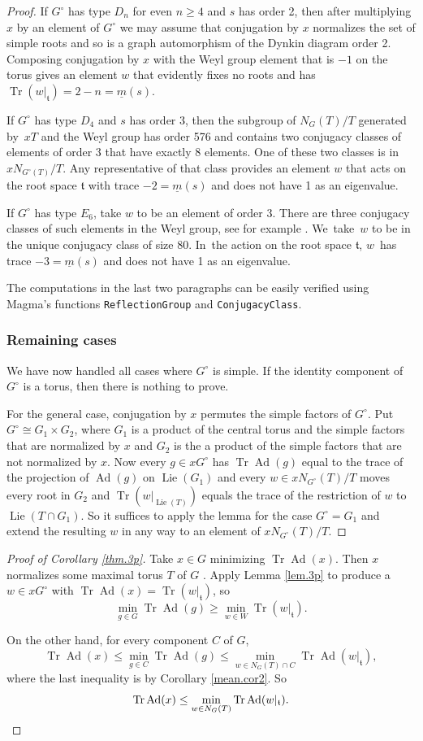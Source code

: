 \documentclass[JEP,XML,SOM,Unicode,NoFloatCountersInSection,published]{cedram}
\newcommand{\proofsec}[1]{\subsubsection*{#1}}
\theoremstyle{definition}
\let\ic\circ
\newcommand{\mft}{\mathfrak{t}}
\newcommand{\mmin}{\underline{m}}
\DeclareMathOperator{\Tr}{Tr}
\DeclareMathOperator{\Ad}{Ad}
\DeclareMathOperator{\Lie}{Lie}
\begin{document}
\begin{proof}
If $G^\ic$ has type $D_n$ for even $n \ge 4$ and $s$ has order 2, then after multiplying $x$ by an element of $G^\ic$ we may assume that conjugation by $x$ normalizes the set of simple roots and so is a graph automorphism of the Dynkin diagram order 2. Composing conjugation by $x$ with the Weyl group element that is $-1$ on the torus gives an element $w$ that evidently fixes no roots and has $\Tr(w\vert_\mft) = 2 - n = \mmin(s)$.

If $G^\ic$ has type $D_4$ and $s$ has order 3, then the subgroup of $N_G(T)/T$ generated by~$xT$ and the Weyl group has order 576 and contains two conjugacy classes of elements of order 3 that have exactly 8 elements. One of these two classes is in $xN_{G^\ic(T)}/T$. Any representative of that class provides an element $w$ that acts on the root space $\mft$ with trace $-2 = \mmin(s)$ and does not have 1 as an eigenvalue.

If $G^\ic$ has type $E_6$, take $w$ to be an element of order 3. There are three conjugacy classes of such elements in the Weyl group, see for example \cite[Table 9]{Carter:weyl}. We~take~$w$ to be in the unique conjugacy class of size 80. In~the action on the root space $\mft$, $w$~has trace $-3 = \mmin(s)$ and does not have 1 as an eigenvalue.

The computations in the last two paragraphs can be easily verified using Magma's functions \texttt{ReflectionGroup} and \texttt{ConjugacyClass}.

\proofsec{Remaining cases}
We have now handled all cases where $G^\ic$ is simple. If the identity component of $G^\ic$ is a torus, then there is nothing to prove.

For the general case, conjugation by $x$ permutes the simple factors of $G^\ic$. Put $G^\ic \cong G_1 \times G_2$, where $G_1$ is a product of the central torus and the simple factors that are normalized by $x$ and $G_2$ is the a product of the simple factors that are not normalized by $x$. Now every $g \in xG^\ic$ has $\Tr \Ad(g)$ equal to the trace of the projection of $\Ad(g)$ on $\Lie(G_1)$ and every $w \in xN_{G^\ic}(T)/T$ moves every root in $G_2$ and $\Tr(w \vert_{\Lie(T)})$ equals the trace of the restriction of $w$ to $\Lie(T \cap G_1)$. So it suffices to apply the lemma for the case $G^\ic = G_1$ and extend the resulting $w$ in any way to an element of $xN_{G^\ic}(T)/T$.
\end{proof}

\begin{proof}[Proof of Corollary \ref{thm.3p}]
Take $x \in G$ minimizing $\Tr \Ad(x)$. Then $x$ normalizes some maximal torus $T$ of $G$ \cite[\S{IX.5.3}, Th.\,1(b)]{Bou:g7}. Apply Lemma \ref{lem.3p}
to produce a~\hbox{$w \in xG^\ic$} with $\Tr \Ad(x) = \Tr(w \vert_\mft)$, so
\[
\min_{g \in G} \Tr \Ad(g) \ge \min_{w \in W} \Tr(w\vert_{\mft}).
\]

On the other hand, for every component $C$ of $G$,
\[
\Tr \Ad(x) \le \min_{g \in C} \Tr \Ad(g) \le \min_{w \in N_G(T) \cap C} \Tr \Ad(w\vert_\mft),
\]
where the last inequality is by Corollary \ref{mean.cor2}. So
\[
\Tr \Ad(x) \le \min_{w \in N_G(T)} \Tr \Ad(w\vert_\mft). \qedhere
\]
\end{proof}
\end{document}
